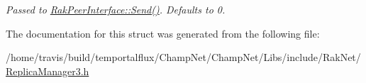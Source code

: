\begin{DoxyCompactItemize}
\begin{DoxyCompactList}\small\item\em Passed to \hyperlink{class_rak_net_1_1_rak_peer_interface_a543ec5be9cf5f73f5c8733d1829789f9}{Rak\-Peer\-Interface\-::\-Send()}. Defaults to 0. \end{DoxyCompactList}\end{DoxyCompactItemize}


The documentation for this struct was generated from the following file\-:\begin{DoxyCompactItemize}
\item 
/home/travis/build/temportalflux/\-Champ\-Net/\-Champ\-Net/\-Libs/include/\-Rak\-Net/\hyperlink{_replica_manager3_8h}{Replica\-Manager3.\-h}\end{DoxyCompactItemize}
